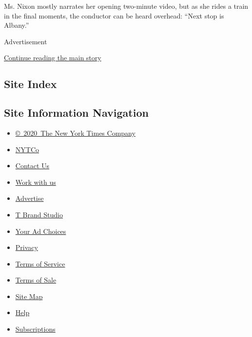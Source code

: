 Ms. Nixon mostly narrates her opening two-minute video, but as she rides
a train in the final moments, the conductor can be heard overhead:
``Next stop is Albany.''

Advertisement

\protect\hyperlink{after-bottom}{Continue reading the main story}

\hypertarget{site-index}{%
\subsection{Site Index}\label{site-index}}

\hypertarget{site-information-navigation}{%
\subsection{Site Information
Navigation}\label{site-information-navigation}}

\begin{itemize}
\tightlist
\item
  \href{https://help.nytimes3xbfgragh.onion/hc/en-us/articles/115014792127-Copyright-notice}{©~2020~The
  New York Times Company}
\end{itemize}

\begin{itemize}
\tightlist
\item
  \href{https://www.nytco.com/}{NYTCo}
\item
  \href{https://help.nytimes3xbfgragh.onion/hc/en-us/articles/115015385887-Contact-Us}{Contact
  Us}
\item
  \href{https://www.nytco.com/careers/}{Work with us}
\item
  \href{https://nytmediakit.com/}{Advertise}
\item
  \href{http://www.tbrandstudio.com/}{T Brand Studio}
\item
  \href{https://www.nytimes3xbfgragh.onion/privacy/cookie-policy\#how-do-i-manage-trackers}{Your
  Ad Choices}
\item
  \href{https://www.nytimes3xbfgragh.onion/privacy}{Privacy}
\item
  \href{https://help.nytimes3xbfgragh.onion/hc/en-us/articles/115014893428-Terms-of-service}{Terms
  of Service}
\item
  \href{https://help.nytimes3xbfgragh.onion/hc/en-us/articles/115014893968-Terms-of-sale}{Terms
  of Sale}
\item
  \href{https://spiderbites.nytimes3xbfgragh.onion}{Site Map}
\item
  \href{https://help.nytimes3xbfgragh.onion/hc/en-us}{Help}
\item
  \href{https://www.nytimes3xbfgragh.onion/subscription?campaignId=37WXW}{Subscriptions}
\end{itemize}
